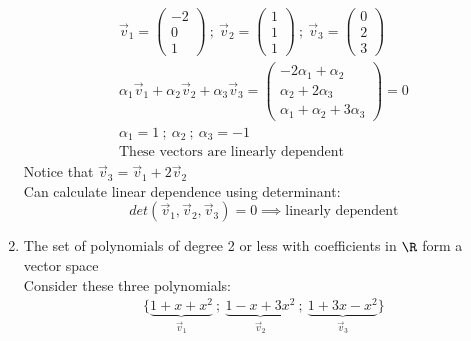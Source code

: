 \documentclass[a4paper, 11pt, normalem]{report}
\begin{document}
\begin{enumerate}
\begin{gather*}
                \vec{v}_{1} =
                \begin{pmatrix}
                    -2 \\
                    0  \\
                    1
                \end{pmatrix} ~;~
                \vec{v}_{2} =
                \begin{pmatrix}
                    1 \\
                    1 \\
                    1
                \end{pmatrix} ~;~
                \vec{v}_{3} =
                \begin{pmatrix}
                    0 \\
                    2 \\
                    3
                \end{pmatrix} \\
                \alpha_{1}\vec{v}_{1} + \alpha_{2}\vec{v}_{2} + \alpha_{3}\vec{v}_{3} =
                \begin{pmatrix}
                    -2\alpha_{1} + \alpha_{2} \\
                    \alpha_{2} + 2\alpha_{3}  \\
                    \alpha_{1} + \alpha_{2} + 3\alpha_{3}
                \end{pmatrix} = 0 \\
                \alpha_{1} = 1 ~;~ \alpha_{2} ~;~ \alpha_{3} = -1 \\
                \text{These vectors are linearly dependent}
            \end{gather*}
            Notice that $\vec{v}_{3} = \vec{v}_{1} + 2\vec{v}_{2}$ \\
            Can calculate linear dependence using determinant:
            \begin{equation*}
                det(\vec{v}_{1},\vec{v}_{2},\vec{v}_{3}) = 0 \implies \text{linearly dependent}
            \end{equation*}
    \item   The set of polynomials of degree 2 or less with coefficients in $\R$ form a vector space \\
    Consider these three polynomials:
            \begin{gather*}
                \Bigg\{\underbrace{1 + x + x^2}_{\vec{v}_1} ~;~ \underbrace{1 - x + 3x^2}_{\vec{v}_2} ~;~ \underbrace{1 + 3x - x^2}_{\vec{v}_3} \Bigg\} \\

\end{gather*}
\end{enumerate}
\end{document}
